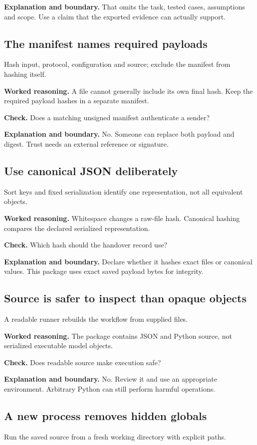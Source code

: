 \textbf{Explanation and boundary.} That omits the task, tested cases, assumptions and scope. Use a claim that the exported evidence can actually support.

\subsection{The manifest names required payloads}
Hash input, protocol, configuration and source; exclude the manifest from hashing itself.

\textbf{Worked reasoning.} A file cannot generally include its own final hash. Keep the required payload hashes in a separate manifest.

\textbf{Check.} Does a matching unsigned manifest authenticate a sender?

\textbf{Explanation and boundary.} No. Someone can replace both payload and digest. Trust needs an external reference or signature.

\subsection{Use canonical JSON deliberately}
Sort keys and fixed serialization identify one representation, not all equivalent objects.

\textbf{Worked reasoning.} Whitespace changes a raw-file hash. Canonical hashing compares the declared serialized representation.

\textbf{Check.} Which hash should the handover record use?

\textbf{Explanation and boundary.} Declare whether it hashes exact files or canonical values. This package uses exact saved payload bytes for integrity.

\subsection{Source is safer to inspect than opaque objects}
A readable runner rebuilds the workflow from supplied files.

\textbf{Worked reasoning.} The package contains JSON and Python source, not serialized executable model objects.

\textbf{Check.} Does readable source make execution safe?

\textbf{Explanation and boundary.} No. Review it and use an appropriate environment. Arbitrary Python can still perform harmful operations.

\subsection{A new process removes hidden globals}
Run the saved source from a fresh working directory with explicit paths.

